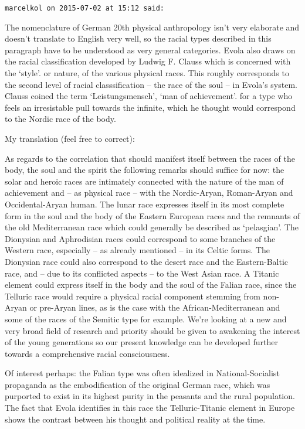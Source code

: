 \begin{footnotesize}\begin{sffamily}



\texttt{marcelkol on 2015-07-02 at 15:12 said: }

The nomenclature of German 20th physical anthropology isn't very elaborate and doesn't translate to English very well, so the racial types described in this paragraph have to be understood as very general categories. Evola also draws on the racial classification developed by Ludwig F. Clauss which is concerned with the `style'. or nature, of the various physical races. This roughly corresponds to the second level of racial classsification – the race of the soul – in Evola's system. Clauss coined the term `Leistungsmensch’, ‘man of achievement'. for a type who feels an irresistable pull towards the infinite, which he thought would correspond to the Nordic race of the body.

My translation (feel free to correct):

\begin{quotex}
As regards to the correlation that should manifest itself between the races of the body, the soul and the spirit the following remarks should suffice for now: the solar and heroic races are intimately connected with the nature of the man of achievement and – as physical race – with the Nordic-Aryan, Roman-Aryan and Occidental-Aryan human. The lunar race expresses itself in its most complete form in the soul and the body of the Eastern European races and the remnants of the old Mediterranean race which could generally be described as `pelasgian'. The Dionysian and Aphrodisian races could correspond to some branches of the Western race, especially – as already mentioned – in its Celtic forms. The Dionysian race could also correspond to the desert race and the Eastern-Baltic race, and – due to its conflicted aspects – to the West Asian race. A Titanic element could express itself in the body and the soul of the Falian race, since the Telluric race would require a physical racial component stemming from non-Aryan or pre-Aryan lines, as is the case with the African-Mediterranean and some of the races of the Semitic type for example. We're looking at a new and very broad field of research and priority should be given to awakening the interest of the young generations so our present knowledge can be developed further towards a comprehensive racial consciousness.

\end{quotex}
Of interest perhaps: the Falian type was often idealized in National-Socialist propaganda as the embodification of the original German race, which was purported to exist in its highest purity in the peasants and the rural population. The fact that Evola identifies in this race the Telluric-Titanic element in Europe shows the contrast between his thought and political reality at the time.



\end{sffamily}
\end{footnotesize}
